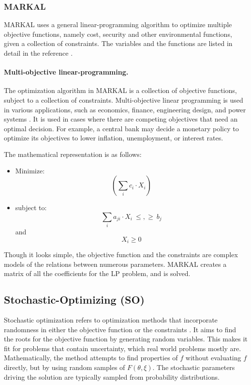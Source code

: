 \subsubsection{\gls{MARKAL}}

\gls{MARKAL} uses a general linear-programming algorithm to 
optimize multiple objective functions, namely cost, security and
other environmental functions, given a collection of constraints.
The variables and the functions are listed in detail in the reference
\cite{fishbone_markal_1981} \cite{abilock_users_1979}. 


\paragraph{Multi-objective linear-programming.}
The optimization algorithm in \gls{MARKAL} is a collection
of objective functions, subject to a collection of constraints.
Multi-objective linear programming is used in various applications,
such as economics, finance, engineering design, and power systems
\cite{dorfman_linear_1958}.
It is used in cases where there are competing objectives that need
an optimal decision. For example, a central bank may decide a monetary 
policy to optimize its objectives to lower inflation, unemployment, 
or interest rates. 
 
The mathematical representation is as follows:

\begin{itemize}
	\item[] Minimize:
	\[(\sum_i c_i \cdot X_i) \]
	\item[]subject to:
	\[ \sum_i a_{ji} \cdot X_i \ \leq , \geq \  b_j \] \quad \textrm{and} \quad \[ 	X_i \geq 0 \]
	
\end{itemize}
	
	

Though it looks simple, the objective function and the
constraints are complex models of the relations between
numerous parameters. \gls{MARKAL} creates a matrix
of all the coefficients for the \gls{LP} problem, and is
solved. 


\subsection{Stochastic-Optimizing (SO)}
Stochastic optimization refers to optimization methods
that incorporate randomness in either the objective function
or the constraints \cite{hannah_stochastic_2015}. It aims to find
the roots for the objective function by generating random variables.
This makes it fit for problems that contain uncertainty, which
real world problems mostly are. 
Mathematically, the method attempts to find properties of $f$ without
evaluating $f$ directly, but by using random samples of $F(\theta, \xi).$
The stochastic parameters driving the solution are typically sampled
from probability distributions.


